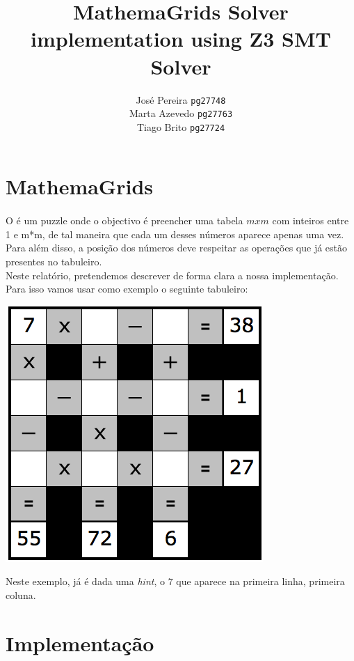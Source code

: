 \documentclass{article}
\title{MathemaGrids Solver\\ implementation using Z3 SMT Solver}
\author{José Pereira \texttt{pg27748} 
		\\ Marta Azevedo \texttt{pg27763}
		              \\ Tiago Brito \texttt{pg27724}}
\begin{document}
\begin{titlepage}
\maketitle
\end{titlepage}

\section{MathemaGrids}

\paragraph{} 
O {} é um puzzle onde o objectivo é preencher uma tabela $mxm$ com inteiros entre 1 e m*m, de tal maneira que cada um desses números aparece apenas uma vez. 
\\

Para além disso, a posição dos números deve respeitar as operações que já estão presentes no tabuleiro.
\\
Neste relatório, pretendemos descrever de forma clara a nossa implementação.
\\

Para isso vamos usar como exemplo o seguinte tabuleiro:
\begin{center}
\includegraphics[scale=0.4]{exemplo_mathemagrids}
\end{center}

Neste exemplo, já é dada uma {\it{hint}}, o $7$ que aparece na primeira linha, primeira coluna.

\section{Implementação}
\end{document}
